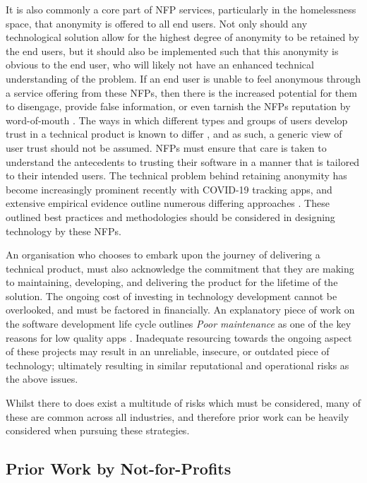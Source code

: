 It is also commonly a core part of NFP services, particularly in the homelessness space, that anonymity is offered to all end users. Not only should any technological solution allow for the highest degree of anonymity to be retained by the end users, but it should also be implemented such that this anonymity is obvious to the end user, who will likely not have an enhanced technical understanding of the problem. If an end user is unable to feel anonymous through a service offering from these NFPs, then there is the increased potential for them to disengage, provide false information, or even tarnish the NFPs reputation by word-of-mouth \cite{gefen2003managing}. The ways in which different types and groups of users develop trust in a technical product is known to differ \cite{xu2014different}, and as such, a generic view of user trust should not be assumed. NFPs must ensure that care is taken to understand the antecedents to trusting their software in a manner that is tailored to their intended users. The technical problem behind retaining anonymity has become increasingly prominent recently with COVID-19 tracking apps, and extensive empirical evidence outline numerous differing approaches \cite{rowe2020contact} \cite{tang2020privacy} \cite{cho2020contact}. These outlined best practices and methodologies should be considered in designing technology by these NFPs.

An organisation who chooses to embark upon the journey of delivering a technical product, must also acknowledge the commitment that they are making to maintaining, developing, and delivering the product for the lifetime of the solution. The ongoing cost of investing in technology development cannot be overlooked, and must be factored in financially. An explanatory piece of work on the software development life cycle outlines \emph{Poor maintenance} as one of the key reasons for low quality apps \cite{inukollu2014factors}. Inadequate resourcing towards the ongoing aspect of these projects may result in an unreliable, insecure, or outdated piece of technology; ultimately resulting in similar reputational and operational risks as the above issues. 

Whilst there to does exist a multitude of risks which must be considered, many of these are common across all industries, and therefore prior work can be heavily considered when pursuing these strategies.

\subsection{Prior Work by Not-for-Profits}

